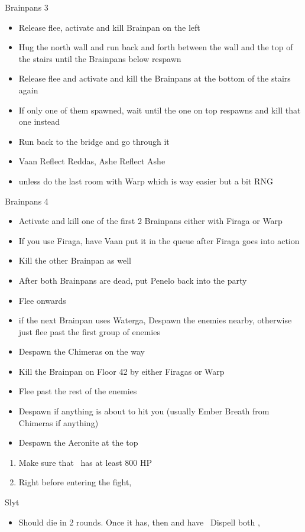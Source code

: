 \begin{battle}{Brainpans 3}
\begin{itemize}
	\item  Release flee, activate and kill Brainpan on the left
	\item  Hug the north wall and run back and forth between the wall and the top of the stairs until the Brainpans below respawn
	\item  Release flee and activate and kill the Brainpans at the bottom of the stairs again
		\item  If only one of them spawned, wait until the one on top respawns and kill that one instead
	\item  Run back to the bridge and go through it
	\item  Vaan Reflect Reddas, Ashe Reflect Ashe
		\item  unless do the last room with Warp which is way easier but a bit RNG
		\end{itemize}
\end{battle}
\begin{battle}{Brainpans 4}
\begin{itemize}
	\item  Activate and kill one of the first 2 Brainpans either with Firaga or Warp
		\item  If you use Firaga, have Vaan put it in the queue after Firaga goes into action
	\item  Kill the other Brainpan as well
	\item  After both Brainpans are dead, put Penelo back into the party
	\item  Flee onwards \item  if the next Brainpan uses Waterga, Despawn the enemies nearby, otherwise just flee past the first group of enemies
	\item  Despawn the Chimeras on the way
	\item  Kill the Brainpan on Floor 42 by either Firagas or Warp
	\item  Flee past the rest of the enemies
		\item  Despawn if anything is about to hit you (usually Ember Breath from Chimeras if anything)
	\item  Despawn the Aeronite at the top
	\end{itemize}
\end{battle}
\begin{enumerate}
	\penelof Reflect \penelo
	\ashef Reflect \ashe
	\item Make sure that \vaan\ has at least 800 HP
	\item Right before entering the fight, \GirlsGambitOn
\end{enumerate}
\begin{battle}{Slyt}
	\begin{itemize}
	\vaanf Confuse between the rounds of \ashe, \penelo's spells
	\item Should die in 2 rounds. Once it has, then \GirlsGambitOff and have \penelo\ Dispell both \ashe, \penelo
	\end{itemize}
\end{battle}